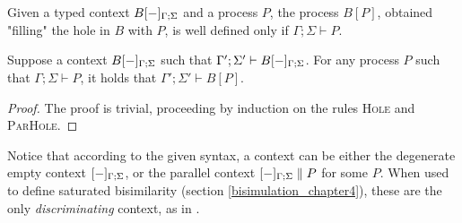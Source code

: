 Given a typed context $B[{-}]_{\Gamma; \Sigma}$ and a process $P$, the process $B[P]$, obtained "filling" the hole in $B$ with $P$, is well defined only if $\Gamma;\Sigma \vdash P$.

\begin{theorem}
	Suppose a context $B[{-}]_{\Gamma; \Sigma}$ such that $\Gamma'; \Sigma' \vdash B[{-}]_{\Gamma; \Sigma}$. For any process $P$ such that $\Gamma; \Sigma \vdash P$, it holds that $\Gamma'; \Sigma' \vdash B[P]$.
\end{theorem}
\begin{proof}
	The proof is trivial, proceeding by induction on the rules {\footnotesize\scshape Hole} and {\footnotesize\scshape ParHole}.
\end{proof}

Notice that according to the given syntax, a context can be either the degenerate empty context $[{-}]_{\Gamma;\Sigma}$, or the parallel context $[{-}]_{\Gamma;\Sigma} \parallel P$ for some $P$. When used to define saturated bisimilarity (section \ref{bisimulation_chapter4}), these are the only \textit{discriminating} context, as in \cite{bonchiGeneralTheoryBarbs2014}.